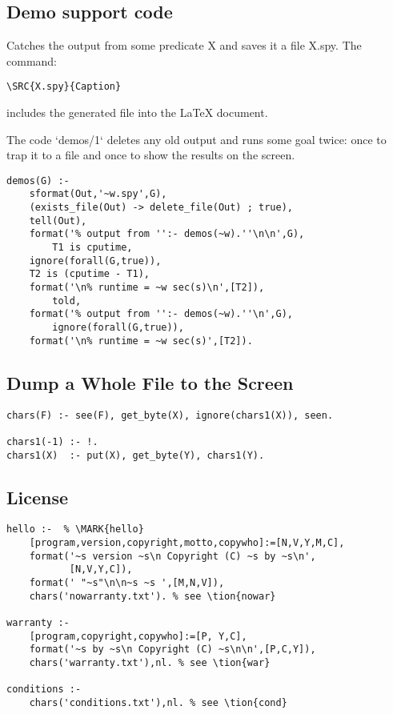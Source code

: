\documentclass[twocolumn,global]{svjour}
\begin{document}
\subsection{ Demo support code
}

Catches the output from some predicate X
and saves it a file X.spy. The command:

{\scriptsize
\begin{verbatim}
\SRC{X.spy}{Caption}
\end{verbatim}}
\noindent
includes the generated file into the {\LaTeX} document.

The code `demos/1` deletes any old output and runs some goal twice: once
to trap it to a file and once to show the results on the screen.  \begin{Verbatim}
demos(G) :-
    sformat(Out,'~w.spy',G),
    (exists_file(Out) -> delete_file(Out) ; true),
    tell(Out),
    format('% output from '':- demos(~w).''\n\n',G),
        T1 is cputime,
    ignore(forall(G,true)),
    T2 is (cputime - T1),
    format('\n% runtime = ~w sec(s)\n',[T2]),
        told,
    format('% output from '':- demos(~w).''\n',G),
        ignore(forall(G,true)),
    format('\n% runtime = ~w sec(s)',[T2]).
\end{Verbatim}
\subsection{ Dump a Whole File to the Screen}\begin{Verbatim}
chars(F) :- see(F), get_byte(X), ignore(chars1(X)), seen.

chars1(-1) :- !.
chars1(X)  :- put(X), get_byte(Y), chars1(Y).
\end{Verbatim}
\subsection{ License }\begin{Verbatim}
hello :-  % \MARK{hello}
    [program,version,copyright,motto,copywho]:=[N,V,Y,M,C],
    format('~s version ~s\n Copyright (C) ~s by ~s\n',
           [N,V,Y,C]),
    format(' "~s"\n\n~s ~s ',[M,N,V]),
    chars('nowarranty.txt'). % see \tion{nowar}

warranty :-
    [program,copyright,copywho]:=[P, Y,C],
    format('~s by ~s\n Copyright (C) ~s\n\n',[P,C,Y]),
    chars('warranty.txt'),nl. % see \tion{war}

conditions :-
    chars('conditions.txt'),nl. % see \tion{cond}
\end{Verbatim}
\end{document}
